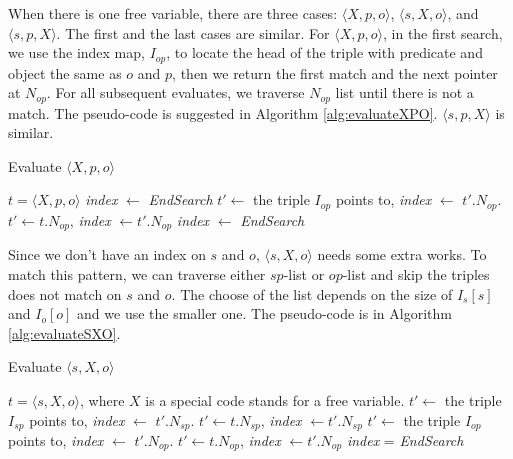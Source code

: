 \documentclass{article}
\begin{document}
\begin{enumerate}
\begin{enumerate}
When there is one free variable, there are three cases: $\langle X, p, o\rangle$, $\langle s, X, o\rangle$, and $\langle s, p, X\rangle$. The first and the last cases are similar. For $\langle X, p, o\rangle$, in the first search, we use the index map, $I_{op}$, to locate the head of the triple with predicate and object the same as $o$ and $p$, then we return the first match and the next pointer at $N_{op}$. For all subsequent evaluates, we traverse $N_{op}$ list until there is not a match. The pseudo-code is suggested in Algorithm \eqref{alg:evaluateXPO}. $\langle s, p, X\rangle$ is similar. 
 
\begin{algorithm}[H]
\caption{Evaluate $\langle X, p, o\rangle$}\label{alg:evaluateXPO}
\begin{algorithmic}
\Require $t = \langle X, p, o\rangle$
\State \textit{index} $\leftarrow$ \textit{EndSearch}
\EndIf
{} 
\State $t'\leftarrow$ the triple $I_{op}$ points to, \textit{index} $\leftarrow$ $t'.N_{op}$.
\Else{}
\State $t'\leftarrow t.N_{op}$, \textit{index} $\leftarrow t'.N_{op}$
\EndIf
{}
\State \textit{index} $\leftarrow$ \textit{EndSearch}
\EndIf
\end{algorithmic}
\end{algorithm}

Since we don't have an index on $s$ and $o$,  $\langle s, X, o\rangle$ needs some extra works. To match this pattern, we can traverse either $sp$-list or $op$-list and skip the triples does not match on $s$ and $o$. The choose of the list depends on the size of $I_s[s]$ and $I_o[o]$ and we use the smaller one. The pseudo-code is in Algorithm \eqref{alg:evaluateSXO}.

\begin{algorithm}[H]
\caption{Evaluate $\langle s, X, o\rangle$}\label{alg:evaluateSXO}
\begin{algorithmic}
\Require $t = \langle s, X, o\rangle$, where $X$ is a special code stands for a free variable. 
\Do
{}
\State $t'\leftarrow$ the triple $I_{sp}$ points to, \textit{index} $\leftarrow$ $t'.N_{sp}$.
\Else 
\State $t'\leftarrow t.N_{sp}$, \textit{index} $\leftarrow t'.N_{sp}$
\EndIf
{}
\Else
\Do
{}
\State $t'\leftarrow$ the triple $I_{op}$ points to, \textit{index} $\leftarrow$ $t'.N_{op}$.
\Else 
\State $t'\leftarrow t.N_{op}$, \textit{index} $\leftarrow t'.N_{op}$
\EndIf
{}
\EndIf
{}
\State \textit{index} = \textit{EndSearch}
\EndIf 
\end{algorithmic}
\end{algorithm}



\end{enumerate}
\end{enumerate}
\end{document}
